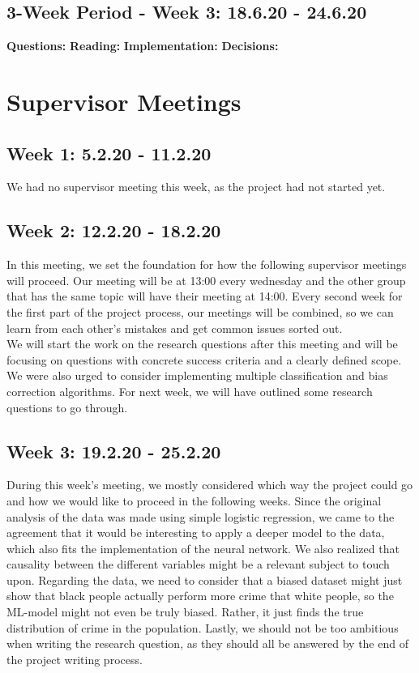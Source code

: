 \documentclass[11pt, fleqn]{article}
\begin{document}
\subsection*{3-Week Period - Week 3: 18.6.20 - 24.6.20}
\textbf{Questions:} 
\textbf{Reading:} 
\textbf{Implementation:} 
\textbf{Decisions:} 


\section*{Supervisor Meetings}

\subsection*{Week 1: 5.2.20 - 11.2.20}
We had no supervisor meeting this week, as the project had not started yet.

\subsection*{Week 2: 12.2.20 - 18.2.20}
In this meeting, we set the foundation for how the following supervisor meetings will proceed. Our meeting will be at 13:00 every wednesday and the other group that has the same topic will have their meeting at 14:00. Every second week for the first part of the project process, our meetings will be combined, so we can learn from each other's mistakes and get common issues sorted out. \\
We will start the work on the research questions after this meeting and will be focusing on questions with concrete success criteria and a clearly defined scope. We were also urged to consider implementing multiple classification and bias correction algorithms. For next week, we will have outlined some research questions to go through.

\subsection*{Week 3: 19.2.20 - 25.2.20}
During this week's meeting, we mostly considered which way the project could go and how we would like to proceed in the following weeks. Since the original analysis of the data was made using simple logistic regression, we came to the agreement that it would be interesting to apply a deeper model to the data, which also fits the implementation of the neural network. We also realized that causality between the different variables might be a relevant subject to touch upon. Regarding the data, we need to consider that a biased dataset might just show that black people actually perform more crime that white people, so the ML-model might not even be truly biased. Rather, it just finds the true distribution of crime in the population. Lastly, we should not be too ambitious when writing the research question, as they should all be answered by the end of the project writing process.
\end{document}
